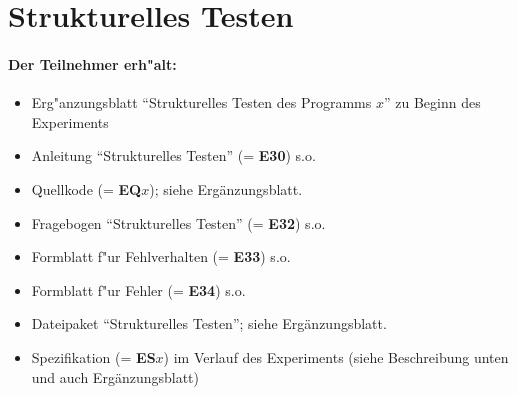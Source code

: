 \newpage
\section*{Strukturelles Testen}

\paragraph{Der Teilnehmer erh"alt:}  
\begin{itemize}
	\item Erg"anzungsblatt "`Strukturelles Testen des Programms $x$"' zu Beginn 
		des Experiments
	\item Anleitung "`Strukturelles Testen"' (= {\bf E30}) s.o.
	\item Quellkode (= {\bf EQ$x$}); siehe Erg\"anzungsblatt.
	\item Fragebogen "`Strukturelles Testen"' (= {\bf E32}) s.o.
	\item Formblatt f"ur Fehlverhalten (= {\bf E33}) s.o.
	\item Formblatt f"ur Fehler (= {\bf E34}) s.o.
	\item Dateipaket "`Strukturelles Testen"'; siehe Erg\"anzungsblatt.
	\item Spezifikation (= {\bf ES$x$}) im Verlauf des Experiments (siehe 
		Beschreibung unten und auch Erg\"anzungsblatt)
\end{itemize}

